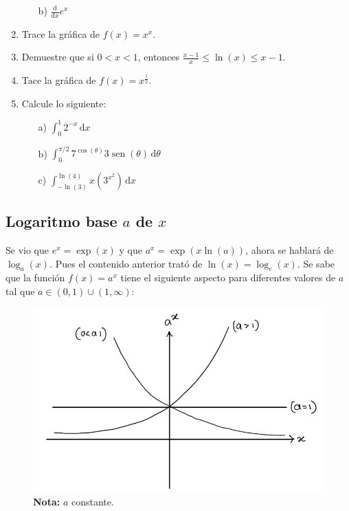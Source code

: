 \documentclass{article}
\numberwithin{equation}{section}
\DeclareMathOperator{\sen}{sen}
\newcommand{\col}[1]{\textcolor{ProcessBlue}{#1}}
\newcommand{\integrate}[4]{\int_{#1}^{#2} \! {#3} \, \mathrm{d} {#4} }
\newcommand{\der}[1]{\frac{\mathrm{d}}{\mathrm{d}#1}}
\begin{document}
\begin{enumerate}
\begin{multicols}{2}
\begin{enumerate}
            \item[b)] $\der{x}e^x$
        \end{enumerate}
    \end{multicols}
    \item Trace la gráfica de $f(x)=x^x$.
    \item Demuestre que si $0<x<1$, entonces $\frac{x-1}{x}\leq\ln(x)\leq x-1$.
    \item Tace la gráfica de $f(x)=x^{\frac{1}{2}}$.
    \item Calcule lo siguiente:
    \begin{multicols}{3}
        \begin{enumerate}
            \item[a)] $\integrate{0}{1}{2^{-x}}{x}$
            \item[b)] $\integrate{0}{\pi /2}{7^{\cos(\theta)}3\sen(\theta)}{\theta}$
            \item[c)] $\integrate{-\ln(3)}{\ln(4)}{x(3^{x^2})}{x}$
        \end{enumerate}
    \end{multicols}
\end{enumerate}

\subsection{\col{Logaritmo base \ensuremath{a} de \ensuremath{x}}}

Se vio que $e^x=\exp(x)$ y que $a^x=\exp(x\ln(a))$, ahora se hablará de $\log_a(x)$. Pues el contenido anterior trató de $\ln(x)=\log_e(x)$. Se sabe que la función $f(x)=a^x$ tiene el siguiente aspecto para diferentes valores de $a$ tal que $a\in(0,1)\cup(1,\infty)$:

\begin{figure}[H]
    \centering
    \includegraphics[scale=0.4]{images/fig16.png}
    \caption{\textbf{Nota:} $a$ constante.}
    \label{fig:fig16}
\end{figure}
\end{document}
